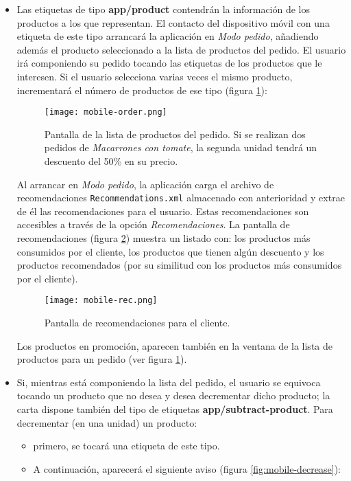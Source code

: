 \begin{itemize}
\item Las etiquetas de tipo \textbf{app/product} contendrán la información de 
los productos a los que representan. El contacto del dispositivo móvil con
una etiqueta de este tipo arrancará la aplicación en \emph{Modo pedido},
añadiendo además el producto seleccionado a la lista de productos del pedido.
El usuario irá componiendo su pedido tocando las etiquetas de los productos
que le interesen. Si el usuario selecciona varias veces el mismo producto,
incrementará el número de productos de ese tipo (figura
\ref{fig:mobile-order}):

  \begin{figure}[H]
    \begin{center}
      \texttt{[image: mobile-order.png]}
      \caption{Pantalla de la lista de productos del pedido. Si se realizan dos 
      pedidos de \emph{Macarrones con tomate}, la segunda unidad tendrá un 
      descuento del 50\% en su precio.}
      \label{fig:mobile-order}
    \end{center}
  \end{figure}

Al arrancar en \emph{Modo pedido}, la aplicación carga el archivo de 
recomendaciones \texttt{Recommendations.xml} almacenado con anterioridad y
extrae de él las recomendaciones para el usuario. Estas recomendaciones son
accesibles a través de la opción \emph{Recomendaciones}. La pantalla de
recomendaciones (figura \ref{fig:mobile-rec}) muestra un listado con: los
productos más consumidos por el cliente, los productos que tienen algún
descuento y los productos recomendados (por su similitud con los productos más
consumidos por el cliente).

  \begin{figure}[H]
    \begin{center}
      \texttt{[image: mobile-rec.png]}
      \caption{Pantalla de recomendaciones para el cliente.}
      \label{fig:mobile-rec}
    \end{center}
  \end{figure}

Los productos en promoción, aparecen también en la ventana de la lista de
productos para un pedido (ver figura \ref{fig:mobile-order}).

\item Si, mientras está componiendo la lista del pedido, el usuario se
equivoca tocando un producto que no desea y desea decrementar dicho producto;
la carta dispone también del tipo de etiquetas \textbf{app/subtract-product}.
Para decrementar (en una unidad) un producto:
  \begin{itemize}
  \item primero, se tocará una etiqueta de este tipo.
  \item A continuación, aparecerá el siguiente aviso (figura
  \ref{fig:mobile-decrease}):


\end{itemize}
\end{itemize}
